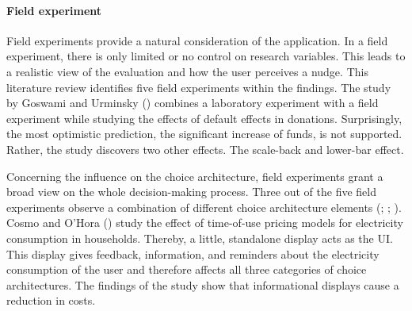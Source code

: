 \paragraph{Field experiment}
Field experiments provide a natural consideration of the application. In a field experiment, there is only limited or no control on research variables. This leads to a realistic view of the evaluation and how the user perceives a nudge. This literature review identifies five field experiments within the findings. The study by Goswami and Urminsky (\citeyear{goswami_when_2016}) combines a laboratory experiment with a field experiment while studying the effects of default effects in donations. Surprisingly, the most optimistic prediction, the significant increase of funds, is not supported. Rather, the study discovers two other effects. The scale-back and lower-bar effect.
 
Concerning the influence on the choice architecture, field experiments grant a broad view on the whole decision-making process. Three out of the five field experiments observe a combination of different choice architecture elements (\cite{miller_effects_2016}; \cite{cosmo_nudging_2017}; \cite{mazar_if_2018}). Cosmo and O'Hora (\citeyear{cosmo_nudging_2017}) study the effect of time-of-use pricing models for electricity consumption in households. Thereby, a little, standalone display acts as the UI. This display gives feedback, information, and reminders about the electricity consumption of the user and therefore affects all three categories of choice architectures. The findings of the study show that informational displays cause a reduction in costs.

